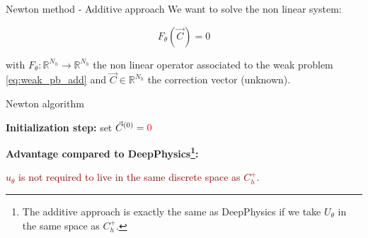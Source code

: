 \begin{frame}{Newton method - Additive approach}
    \vspace{-5pt}
    We want to solve the non linear system: %

    \normalsize
    \vspace{-10pt}
    \begin{equation*}
        F_\theta(\vec{C}) = 0 
    \end{equation*}

    \vspace{-2pt}
    with $F_\theta:\mathbb{R}^{N_h} \to \mathbb{R}^{N_h}$ the non linear operator associated to the weak problem \eqref{eq:weak_pb_add} and $\vec{C}\in \mathbb{R}^{N_h}$ the correction vector (unknown).

	\setcounter{algocf}{1}
    \begin{center}
        \small
        \begin{minipage}{0.9\linewidth}
            \begin{algorithm}[H]
                \SetAlgoLined
                \caption{Newton algorithm \citep{newton_accel_2025}}
                \textbf{Initialization step:} set $\vec{C}^{(0)} = \textcolor{darkred}{0}$\;
            \end{algorithm}
        \end{minipage}
    \end{center}
    
    \vspace{3pt}
    \textbf{Advantage compared to DeepPhysics\footnote[frame,1]{The additive approach is exactly the same as DeepPhysics if we take $U_\theta$ in the same space as $C_h^+$.}:} 

    \vspace{-2pt}
    \begin{center}
        \textcolor{darkred}{$u_\theta$ is not required to live in the same discrete space as $C_h^+$}.
    \end{center}
    \vspace{8pt}
\end{frame}